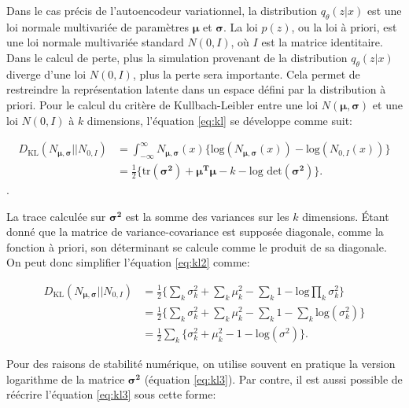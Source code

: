 Dans le cas précis de l'autoencodeur variationnel, la distribution $q_{\theta}(z|x)$ est une loi normale multivariée de paramètres $\boldsymbol \mu$ et $\boldsymbol \sigma$. La loi $p(z)$, ou la loi à priori, est une loi normale multivariée standard $N(0,I)$, où $I$ est la matrice identitaire. Dans le calcul de perte, plus la simulation provenant de la distribution $q_{\theta}(z|x)$ diverge d'une loi $N(0, I)$, plus la perte sera importante. Cela permet de restreindre la représentation latente dans un espace défini par la distribution à priori. Pour le calcul du critère de Kullbach-Leibler entre une loi $N(\boldsymbol \mu, \boldsymbol \sigma)$ et une loi $N(0, I)$ à $k$ dimensions, l'équation \ref{eq:kl} se développe comme suit:

\begin{equation}  \label{eq:kl2}
	\begin{aligned}
	D_{\text{KL}}(N_{\boldsymbol \mu, \boldsymbol \sigma} || N_{0,I}) &= \int_{-\infty}^{\infty} N_{\boldsymbol \mu, \boldsymbol \sigma}(x) \big\{\text{log}(N_{\boldsymbol \mu,\boldsymbol \sigma}(x)) - \text{log}(N_{0,I}(x))\big\} \\
		&= \frac{1}{2}\big\{\text{tr}(\boldsymbol{\sigma^2}) + \boldsymbol{\mu^T} \boldsymbol{\mu} - k - \text{log det}(\boldsymbol{\sigma^2})\big \}.
 	\end{aligned}
\end{equation}.

La trace calculée sur $\boldsymbol{\sigma^2}$ est la somme des variances sur les $k$ dimensions. Étant donné que la matrice de variance-covariance est supposée diagonale, comme la fonction à priori, son déterminant se calcule comme le produit de sa diagonale. On peut donc simplifier l'équation \ref{eq:kl2} comme:

\begin{equation}  \label{eq:kl3}
\begin{aligned}
D_{\text{KL}}(N_{\boldsymbol \mu, \boldsymbol \sigma} || N_{0,I}) &=  \frac{1}{2}\Big\{\sum_k \sigma_{k}^2+ \sum_{k}\mu_{k}^2 - \sum_{k} 1 - \text{log} \prod_{k}\sigma_{k}^2\Big \} \\
&=\frac{1}{2}\Big\{\sum_k \sigma_{k}^2+ \sum_{k}\mu_{k}^2 - \sum_{k} 1 - \sum_{k} \text{log} (\sigma_{k}^2)\Big \} \\
&=\frac{1}{2} \sum_{k}\Big\{\sigma_{k}^2 + \mu_{k}^2 - 1 - \text{log}(\sigma^2)\Big\}.
\end{aligned}
\end{equation}

Pour des raisons de stabilité numérique, on utilise souvent en pratique la version logarithme de la matrice $\boldsymbol{\sigma^2}$ (équation \ref{eq:kl3}). Par contre, il est aussi possible de réécrire l'équation \ref{eq:kl3} sous cette forme:

